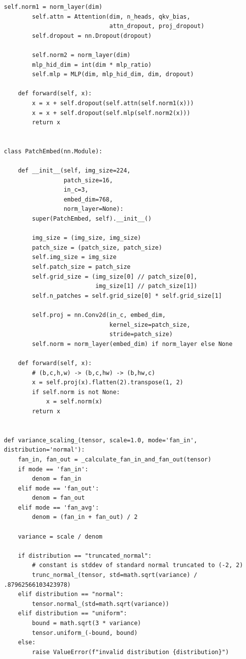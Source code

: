 \begin{lstlisting}[style=Python]
        self.norm1 = norm_layer(dim)
        self.attn = Attention(dim, n_heads, qkv_bias,
                              attn_dropout, proj_dropout)
        self.dropout = nn.Dropout(dropout)

        self.norm2 = norm_layer(dim)
        mlp_hid_dim = int(dim * mlp_ratio)
        self.mlp = MLP(dim, mlp_hid_dim, dim, dropout)

    def forward(self, x):
        x = x + self.dropout(self.attn(self.norm1(x)))
        x = x + self.dropout(self.mlp(self.norm2(x)))
        return x


class PatchEmbed(nn.Module):

    def __init__(self, img_size=224,
                 patch_size=16,
                 in_c=3,
                 embed_dim=768,
                 norm_layer=None):
        super(PatchEmbed, self).__init__()

        img_size = (img_size, img_size)
        patch_size = (patch_size, patch_size)
        self.img_size = img_size
        self.patch_size = patch_size
        self.grid_size = (img_size[0] // patch_size[0],
                          img_size[1] // patch_size[1])
        self.n_patches = self.grid_size[0] * self.grid_size[1]

        self.proj = nn.Conv2d(in_c, embed_dim,
                              kernel_size=patch_size,
                              stride=patch_size)
        self.norm = norm_layer(embed_dim) if norm_layer else None

    def forward(self, x):
        # (b,c,h,w) -> (b,c,hw) -> (b,hw,c)
        x = self.proj(x).flatten(2).transpose(1, 2)
        if self.norm is not None:
            x = self.norm(x)
        return x


def variance_scaling_(tensor, scale=1.0, mode='fan_in', distribution='normal'):
    fan_in, fan_out = _calculate_fan_in_and_fan_out(tensor)
    if mode == 'fan_in':
        denom = fan_in
    elif mode == 'fan_out':
        denom = fan_out
    elif mode == 'fan_avg':
        denom = (fan_in + fan_out) / 2

    variance = scale / denom

    if distribution == "truncated_normal":
        # constant is stddev of standard normal truncated to (-2, 2)
        trunc_normal_(tensor, std=math.sqrt(variance) / .87962566103423978)
    elif distribution == "normal":
        tensor.normal_(std=math.sqrt(variance))
    elif distribution == "uniform":
        bound = math.sqrt(3 * variance)
        tensor.uniform_(-bound, bound)
    else:
        raise ValueError(f"invalid distribution {distribution}")


\end{lstlisting}
